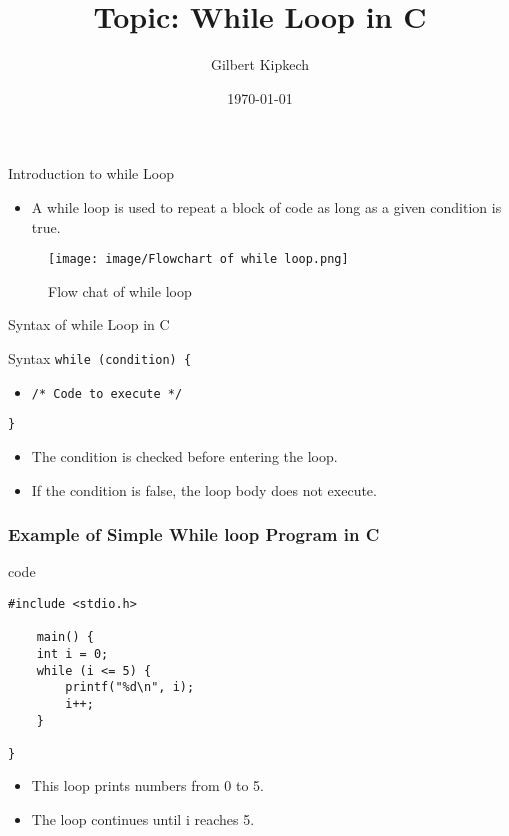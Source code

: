 \documentclass{beamer}
\title{Topic: While Loop in C}
\author{Gilbert Kipkech}
\date{\today}
\begin{document}
\frame{\titlepage}

\begin{frame}{Introduction to while Loop}
\begin{itemize}
        \item A while loop is used to repeat a block of code as long as a given condition is true.
        
    \end{itemize}
\begin{figure}
    \centering
    \texttt{[image: image/Flowchart of while loop.png]}
    \caption{Flow chat of while loop}
    \label{fig:enter-label}
\end{figure}

\end{frame}

\begin{frame}{Syntax of while Loop in C}
    \begin{block}{Syntax}
        \texttt{while (condition) \{}
        \begin{itemize}
            \item \texttt{/* Code to execute */}
        \end{itemize}
        \texttt{\}}
    \end{block}
    \begin{itemize}
        \item The condition is checked before entering the loop.
        \item If the condition is false, the loop body does not execute.
    \end{itemize}
\end{frame}

\begin{frame}[fragile]
    \frametitle{Example of Simple While loop Program in C}
\begin{block}{code}
    
 \begin{lstlisting}
#include <stdio.h>

    main() {
    int i = 0;
    while (i <= 5) {  
        printf("%d\n", i);
        i++;
    }
  
}
\end{lstlisting}

    \end{block}
    \begin{itemize}
        \item This loop prints numbers from 0 to 5.
        \item The loop continues until {i} reaches 5.
    \end{itemize}
\end{frame}
\end{document}
